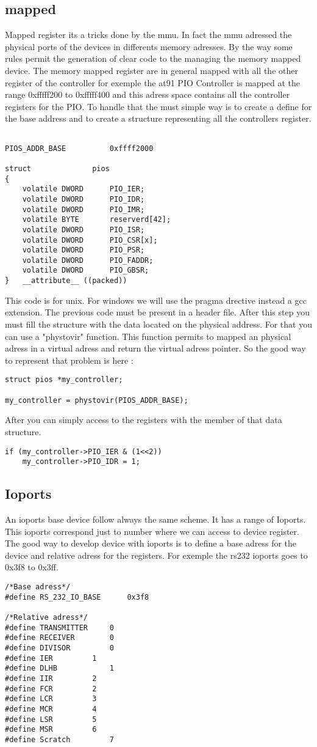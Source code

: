 \documentclass[11pt]{report}
\begin{document}
\subsection{mapped}
Mapped register its a tricks done by the mmu. In fact the mmu adressed the physical
ports of the devices in differents memory adresses. By the way some rules permit
the generation of clear code to the managing the memory mapped device. The memory
mapped register are in general mapped with all the other register of the controller
for exemple the at91 PIO Controller is mapped at the range 0xfffff200 to 0xfffff400
and this adress space contains all the controller registers for the PIO. To handle that
the must simple way is to create a define for the base address and to create a structure 
representing all the controllers register.
\begin{lstlisting}

PIOS_ADDR_BASE			0xffff2000

struct				pios
{
	volatile DWORD		PIO_IER;
	volatile DWORD		PIO_IDR;
	volatile DWORD		PIO_IMR;
	volatile BYTE		reserverd[42];
	volatile DWORD		PIO_ISR;
	volatile DWORD		PIO_CSR[x];
	volatile DWORD		PIO_PSR;
	volatile DWORD		PIO_FADDR;
	volatile DWORD		PIO_GBSR;
}	__attribute__ ((packed))

\end{lstlisting}

This code is for unix. For windows we will use the pragma drective instead a gcc extension.
The previous code must be present in a header file. After this step you must fill the 
structure with the data located on the physical address. For that you can use a "phystovir" 
function. This function permits to mapped an physical adress in a virtual adress and return 
the virtual adress pointer. So the good way to represent that problem is here : 

\begin{lstlisting}
struct pios *my_controller;

my_controller = phystovir(PIOS_ADDR_BASE);
\end{lstlisting}
After you can simply access to the registers with the member of that data structure.
\begin{lstlisting}
if (my_controller->PIO_IER & (1<<2))
	my_controller->PIO_IDR = 1;
\end{lstlisting}
\subsection{Ioports}
An ioports base device follow always the same scheme. It has a range of Ioports. This
ioports correspond just to number where we can access to device register.
The good way to develop device with ioports is to define a base adress for the device and
relative adress for the registers. For exemple the rs232 ioports goes to 0x3f8 to 0x3ff.
\begin{lstlisting}
/*Base adress*/
#define RS_232_IO_BASE		0x3f8

/*Relative adress*/
#define	TRANSMITTER		0
#define	RECEIVER		0
#define	DIVISOR			0
#define	IER			1
#define	DLHB			1
#define	IIR			2
#define	FCR			2
#define	LCR			3
#define	MCR			4
#define	LSR			5
#define	MSR			6
#define Scratch			7
\end{lstlisting}
\end{document}

